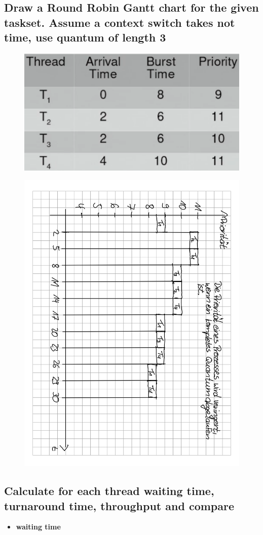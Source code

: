 \subsection{Draw a Round Robin Gantt chart for the given taskset. Assume a context switch takes not time, use quantum of length 3}
\begin{figure}[H]
	\centering
	\includegraphics[width=0.25\linewidth]{Pictures/scheduling_gantt_table_rr_prio}
\end{figure}
\begin{figure}[H]
	\centering
	\includegraphics[width=0.6\linewidth,angle=90,origin=c]{Pictures/scheduling_gantt_dia_rr_prio}
\end{figure}

\subsection{Calculate for each thread waiting time, turnaround time, throughput and compare}
\begin{itemize}
	\setlength\itemsep{-0.5em}
	\item \textbf{waiting time}
\end{itemize}